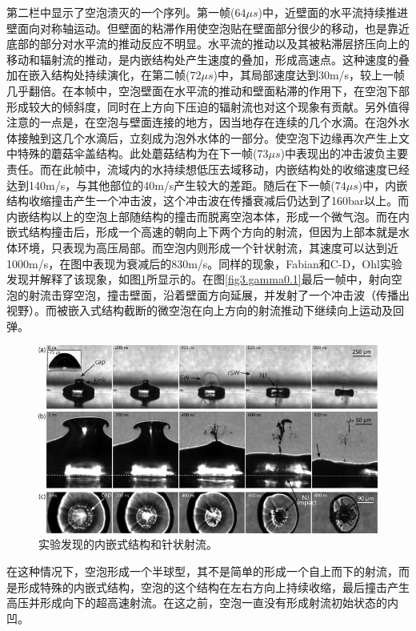 第二栏中显示了空泡溃灭的一个序列。第一帧($64 \mu s$)中，近壁面的水平流持续推进壁面向对称轴运动。但壁面的粘滞作用使空泡贴在壁面部分很少的移动，也是靠近底部的部分对水平流的推动反应不明显。水平流的推动以及其被粘滞层挤压向上的移动和辐射流的推动，是内嵌结构处产生速度的叠加，形成高速点。这种速度的叠加在嵌入结构处持续演化，在第二帧($ 72\mu s$)中，其局部速度达到30m/s，较上一帧几乎翻倍。在本帧中，空泡壁面在水平流的推动和壁面粘滞的作用下，在空泡下部形成较大的倾斜度，同时在上方向下压迫的辐射流也对这个现象有贡献。另外值得注意的一点是，在空泡与壁面连接的地方，因当地存在连续的几个水滴。在泡外水体接触到这几个水滴后，立刻成为泡外水体的一部分。使空泡下边缘再次产生上文中特殊的蘑菇伞盖结构。此处蘑菇结构为在下一帧($ 73\mu s$)中表现出的冲击波负主要责任。而在此帧中，流域内的水持续想低压去域移动，内嵌结构处的收缩速度已经达到140m/s，与其他部位的40m/s产生较大的差距。随后在下一帧($ 74\mu s$)中，内嵌结构收缩撞击产生一个冲击波，这个冲击波在传播衰减后仍达到了160bar以上。而内嵌结构以上的空泡上部随结构的撞击而脱离空泡本体，形成一个微气泡。而在内嵌式结构撞击后，形成一个高速的朝向上下两个方向的射流，但因为上部本就是水体环境，只表现为高压局部。而空泡内则形成一个针状射流，其速度可以达到近1000m/s，在图中表现为衰减后的830m/s。同样的现象，Fabian和C-D，Ohl实验发现并解释了该现象\cite{reuter_supersonic_2021}，如图\ref{fig3.needlejet}所显示的。在图\ref{fig3.gamma0.1}最后一帧中，射向空泡的射流击穿空泡，撞击壁面，沿着壁面方向延展，并发射了一个冲击波（传播出视野）。而被嵌入式结构截断的微空泡在向上方向的射流推动下继续向上运动及回弹。


\begin{figure}[h]
    \centering
    \includegraphics[width=0.9\linewidth]{img/fig3fabiandieter.jpg}
    \caption[实验发现的内嵌式结构和针状射流]{实验发现的内嵌式结构和针状射流\cite{reuter_supersonic_2021}。}
    \label{fig3.needlejet}
\end{figure}

在这种情况下，空泡形成一个半球型，其不是简单的形成一个自上而下的射流，而是形成特殊的内嵌式结构，空泡的这个结构在左右方向上持续收缩，最后撞击产生高压并形成向下的超高速射流。在这之前，空泡一直没有形成射流初始状态的内凹。



